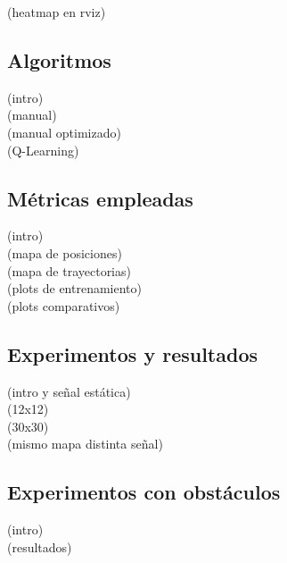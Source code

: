 (heatmap en rviz)\\

\subsection{Algoritmos}
\label{subsec:algoritmos}

(intro)\\

(manual)\\

(manual optimizado)\\

(Q-Learning)\\

\subsection{Métricas empleadas}
\label{subsec:metricas}

(intro)\\

(mapa de posiciones)\\

(mapa de trayectorias)\\

(plots de entrenamiento)\\

(plots comparativos)\\

\subsection{Experimentos y resultados}
\label{subsec:experimentos_resultados}

(intro y señal estática)\\

(12x12)\\

(30x30)\\

(mismo mapa distinta señal)\\

\subsection{Experimentos con obstáculos}
\label{subsec:experimentos_obstaculos}

(intro)\\

(resultados)\\

